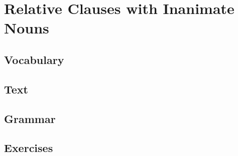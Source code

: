 \chapter{Relative Clauses with Inanimate Nouns}
\section*{Vocabulary}
\section*{Text}
\section*{Grammar}
\section*{Exercises}
